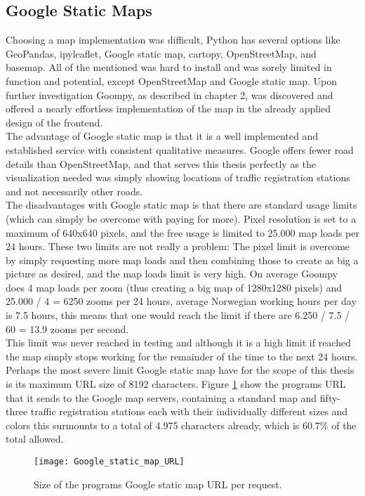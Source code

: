 \subsection{Google Static Maps}
Choosing a map implementation was difficult, Python has several options like GeoPandas, ipyleaflet, Google static map, cartopy, OpenStreetMap, and basemap. All of the mentioned was hard to install and was sorely limited in function and potential, except OpenStreetMap and Google static map. Upon further investigation Goompy, as described in chapter 2, was discovered and offered a nearly effortless implementation of the map in the already applied design of the frontend.
\\
The advantage of Google static map is that it is a well implemented and established service with consistent qualitative measures. Google offers fewer road details than OpenStreetMap, and that serves this thesis perfectly as the visualization needed was simply showing locations of traffic registration stations and not necessarily other roads. 
\\
The disadvantages with Google static map is that there are standard usage limits (which can simply be overcome with paying for more). Pixel resolution is set to a maximum of 640x640 pixels, and the free usage is limited to 25.000 map loads per 24 hours. These two limits are not really a problem: The pixel limit is overcome by simply requesting more map loads and then combining those to create as big a picture as desired, and the map loads limit is very high. On average Goompy does 4 map loads per zoom (thus creating a big map of 1280x1280 pixels) and 25.000 / 4 = 6250 zooms per 24 hours, average Norwegian working hours per day is 7.5 hours, this means that one would reach the limit if there are 6.250 / 7.5 / 60 = 13.9 zooms per second. 
\\
This limit was never reached in testing and although it is a high limit if reached the map simply stops working for the remainder of the time to the next 24 hours. Perhaps the most severe limit Google static map have for the scope of this thesis is its maximum URL size of 8192 characters. Figure \ref{fig:google_url} show the programs URL that it sends to the Google map servers, containing a standard map and fifty-three traffic registration stations each with their individually different sizes and colors this surmounts to a total of 4.975 characters already, which is 60.7\% of the total allowed. 

\begin{figure}[!htb]
\texttt{[image: Google\_static\_map\_URL]}
\centering
\caption{Size of the programs Google static map URL per request.}
\label{fig:google_url}
\end{figure}

